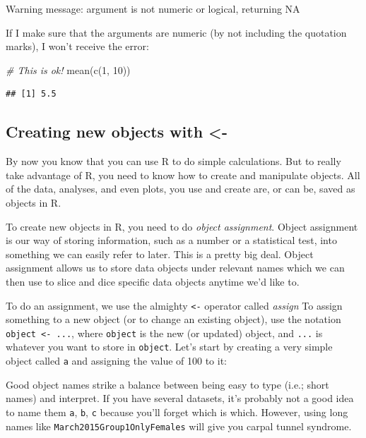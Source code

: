 \documentclass[
]{book}
\newenvironment{Shaded}{\begin{snugshade}}{\end{snugshade}}
\newcommand{\CommentTok}[1]{\textcolor[rgb]{0.56,0.35,0.01}{\textit{#1}}}
\newcommand{\DecValTok}[1]{\textcolor[rgb]{0.00,0.00,0.81}{#1}}
\newcommand{\FunctionTok}[1]{\textcolor[rgb]{0.00,0.00,0.00}{#1}}
\newcommand{\NormalTok}[1]{#1}
\begin{document}
Warning message: argument is not numeric or logical, returning NA

If I make sure that the arguments are numeric (by not including the quotation marks), I won't receive the error:

\begin{Shaded}
\begin{Highlighting}[]
\CommentTok{\# This is ok!}
\FunctionTok{mean}\NormalTok{(}\FunctionTok{c}\NormalTok{(}\DecValTok{1}\NormalTok{, }\DecValTok{10}\NormalTok{))}
\end{Highlighting}
\end{Shaded}

\begin{verbatim}
## [1] 5.5
\end{verbatim}

\hypertarget{creating-new-objects-with--}{%
\subsection{Creating new objects with \textless-}\label{creating-new-objects-with--}}

By now you know that you can use R to do simple calculations. But to really take advantage of R, you need to know how to create and manipulate objects. All of the data, analyses, and even plots, you use and create are, or can be, saved as objects in R.

To create new objects in R, you need to do \emph{object assignment}. Object assignment is our way of storing information, such as a number or a statistical test, into something we can easily refer to later. This is a pretty big deal. Object assignment allows us to store data objects under relevant names which we can then use to slice and dice specific data objects anytime we'd like to.

To do an assignment, we use the almighty \texttt{\textless{}-} operator called \emph{assign} To assign something to a new object (or to change an existing object), use the notation \texttt{object\ \textless{}-\ ...}, where \texttt{object} is the new (or updated) object, and \texttt{...} is whatever you want to store in \texttt{object}. Let's start by creating a very simple object called \texttt{a} and assigning the value of 100 to it:

Good object names strike a balance between being easy to type (i.e.; short names) and interpret. If you have several datasets, it's probably not a good idea to name them \texttt{a}, \texttt{b}, \texttt{c} because you'll forget which is which. However, using long names like \texttt{March2015Group1OnlyFemales} will give you carpal tunnel syndrome.
\end{document}
